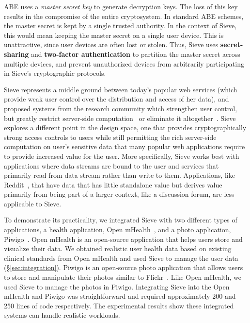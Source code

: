 \begin{smitemize}
  \item ABE uses a \emph{master secret key} to generate
  decryption keys. The loss of this key results
  in the compromise of the entire cryptosystem. In
  standard ABE schemes, the master secret is kept by a
  single trusted authority. In the context of Sieve,
  this would mean keeping the master secret on a single
  user device. This is unattractive, since user devices
  are often lost or stolen. Thus, Sieve
  uses \textbf{secret-sharing} and \textbf{two-factor
  authentication} to partition the master secret across
  multiple devices, and prevent unauthorized devices
  from arbitrarily participating in Sieve's cryptographic
  protocols.
    
\end{smitemize}

Sieve represents a middle ground between today's
popular web services (which provide weak user
control over the distribution and access of her data), 
and proposed systems from the
research community which strengthen user control,
but greatly restrict server-side computation~\cite{mylar}
or eliminate it altogether~\cite{sundr,depot,sporc,bstore,depSky}.
Sieve explores a
different point in the design space, one that
provides cryptographically strong access controls
to users while still permitting the rich
server-side computation on user's sensitive data
that many popular web
applications require to provide increased value
for the user. More specifically, Sieve works best
with applications where data streams are bound to the user
and services that primarily read from data stream rather than
write to them. Applications, like Reddit~\cite{reddit}, that
have data that has little standalone value but
derives value primarily 
from being part of a larger context,
like a discussion forum, are less applicable to Sieve.

To demonstrate its practicality, we integrated Sieve with
two different types of applications, a health application, 
Open mHealth~\cite{omh}, and a photo application, Piwigo~\cite{piwigo}.
Open mHealth is an open-source application that 
helps users store and visualize their data. We obtained
realistic user health data based on existing clinical standards
from Open mHealth and used Sieve 
to manage the user data (\S\ref{sec:integration}). Piwigo
is an open-source photo application that allows users to store
and manipulate their photos similar to Flickr~\cite{flickr}. 
Like Open mHealth, we used Sieve to manage the photos in Piwigo.
Integrating Sieve into the Open mHealth and Piwigo 
was straightforward and required approximately 200 and 250 lines of code
respectively. The experimental results show these integrated systems
can handle realistic workloads.